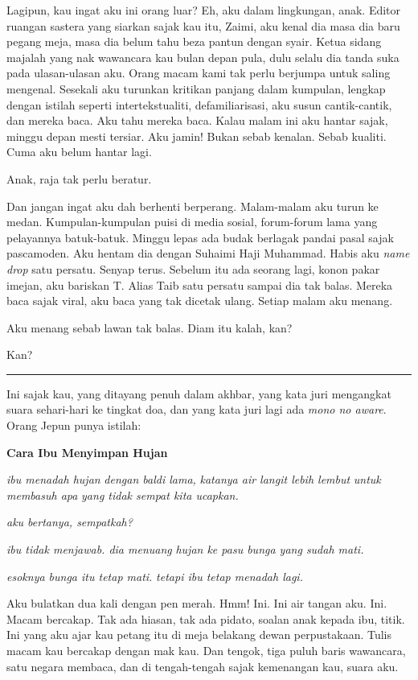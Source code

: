 \documentclass[
  11pt,
  a5paper,
  openany,
  oneside]{book}
\begin{document}
Lagipun, kau ingat aku ini orang luar? Eh, aku dalam lingkungan, anak.
Editor ruangan sastera yang siarkan sajak kau itu, Zaimi, aku kenal dia
masa dia baru pegang meja, masa dia belum tahu beza pantun dengan syair.
Ketua sidang majalah yang nak wawancara kau bulan depan pula, dulu
selalu dia tanda suka pada ulasan-ulasan aku. Orang macam kami tak perlu
berjumpa untuk saling mengenal. Sesekali aku turunkan kritikan panjang
dalam kumpulan, lengkap dengan istilah seperti intertekstualiti,
defamiliarisasi, aku susun cantik-cantik, dan mereka baca. Aku tahu
mereka baca. Kalau malam ini aku hantar sajak, minggu depan mesti
tersiar. Aku jamin! Bukan sebab kenalan. Sebab kualiti. Cuma aku belum
hantar lagi.

Anak, raja tak perlu beratur.

Dan jangan ingat aku dah berhenti berperang. Malam-malam aku turun ke
medan. Kumpulan-kumpulan puisi di media sosial, forum-forum lama yang
pelayannya batuk-batuk. Minggu lepas ada budak berlagak pandai pasal
sajak pascamoden. Aku hentam dia dengan Suhaimi Haji Muhammad. Habis aku
\emph{name drop} satu persatu. Senyap terus. Sebelum itu ada seorang
lagi, konon pakar imejan, aku bariskan T. Alias Taib satu persatu sampai
dia tak balas. Mereka baca sajak viral, aku baca yang tak dicetak ulang.
Setiap malam aku menang.

Aku menang sebab lawan tak balas. Diam itu kalah, kan?

Kan?

\begin{center}\rule{0.5\linewidth}{0.5pt}\end{center}

Ini sajak kau, yang ditayang penuh dalam akhbar, yang kata juri
mengangkat suara sehari-hari ke tingkat doa, dan yang kata juri lagi ada
\emph{mono no aware}. Orang Jepun punya istilah:

\textbf{Cara Ibu Menyimpan Hujan}

\emph{ibu menadah hujan} \emph{dengan baldi lama,} \emph{katanya air
langit lebih lembut} \emph{untuk membasuh apa} \emph{yang tidak sempat
kita ucapkan.}

\emph{aku bertanya, sempatkah?}

\emph{ibu tidak menjawab. dia menuang} \emph{hujan ke pasu bunga yang
sudah mati.}

\emph{esoknya bunga itu tetap mati.} \emph{tetapi ibu tetap menadah
lagi.}

Aku bulatkan dua kali dengan pen merah. Hmm! Ini. Ini air tangan aku.
Ini. Macam bercakap. Tak ada hiasan, tak ada pidato, soalan anak kepada
ibu, titik. Ini yang aku ajar kau petang itu di meja belakang dewan
perpustakaan. Tulis macam kau bercakap dengan mak kau. Dan tengok, tiga
puluh baris wawancara, satu negara membaca, dan di tengah-tengah sajak
kemenangan kau, suara aku.
\end{document}
